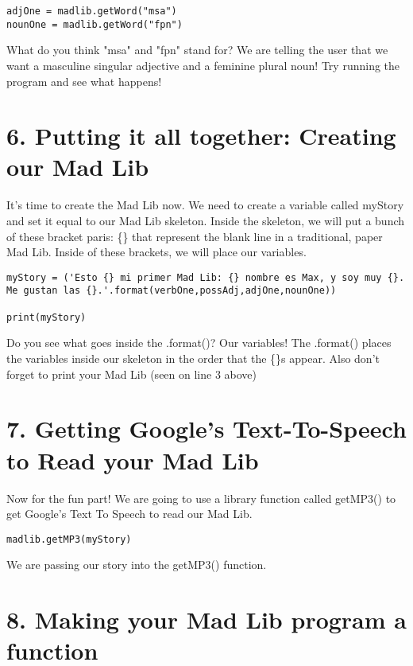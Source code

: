 \documentclass[a4paper,11pt]{article}
\theoremstyle{mytheor}
\begin{document}
\begin{lstlisting}[label={list:second},caption=Add this to the bottom of your code]
adjOne = madlib.getWord("msa")
nounOne = madlib.getWord("fpn")
\end{lstlisting}
What do you think "msa" and "fpn" stand for? 
We are telling the user that we want a masculine singular adjective and a feminine plural noun!
\newline
\newline
Try running the program and see what happens!

\section*{6. Putting it all together: Creating our Mad Lib}

It's time to create the Mad Lib now. 
We need to create a variable called myStory and set it equal to our Mad Lib skeleton. 
Inside the skeleton, we will put a bunch of these bracket paris:  \{\} that represent the blank line in a traditional, paper Mad Lib. 
Inside of these brackets, we will place our variables.

\begin{lstlisting}[label={list:second},caption=Add this to the bottom of your code]
myStory = ('Esto {} mi primer Mad Lib: {} nombre es Max, y soy muy {}. Me gustan las {}.'.format(verbOne,possAdj,adjOne,nounOne))

print(myStory)
\end{lstlisting}
Do you see what goes inside the .format()? Our variables! The .format() places the variables inside our skeleton in the order that the \{\}s appear. Also don't forget to print your Mad Lib (seen on line 3 above)


\section*{7. Getting Google's Text-To-Speech to Read your Mad Lib}

Now for the fun part! We are going to use a library function called getMP3() to get Google's Text To Speech to read our Mad Lib.

\begin{lstlisting}[label={list:second},caption=Add this to the bottom of your code]
madlib.getMP3(myStory)
\end{lstlisting}
We are passing our story into the getMP3() function.


\section*{8. Making your Mad Lib program a function}
\end{document}
